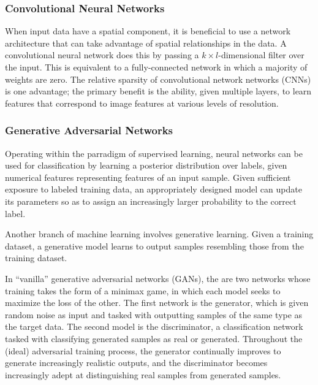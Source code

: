 \subsubsection{Convolutional Neural Networks}
When input data have a spatial component, it is beneficial to use a network architecture 
that can take advantage of spatial relationships in the data. A convolutional neural network 
does this by passing a $k \times l$-dimensional filter over the input. 
This is equivalent to a fully-connected network in which a majority of weights are zero.
The relative sparsity of convolutional network networks (CNNs) is one advantage; the primary 
benefit is the ability, given multiple layers, to learn features that correspond to image 
features at various levels of resolution.

\subsubsection{Generative Adversarial Networks}
Operating within the parradigm of supervised learning, neural networks
can be used for classification by learning a posterior distribution over 
labels, given numerical features representing features of an input sample.
Given sufficient exposure to labeled training data, an appropriately designed 
model can update its parameters so as to assign an increasingly larger probability
to the correct label.

Another branch of machine learning involves generative learning. Given a training dataset,
a generative model learns to output samples resembling those from the training dataset. 

In ``vanilla'' generative adversarial networks (GANs), the are two networks whose training 
takes the form of a minimax game, in which each model seeks to maximize the loss of the other.
The first network is the generator, which is given random noise as input and tasked with 
outputting samples of the same type as the target data. The second model is the discriminator,
a classification network tasked with classifying generated samples as real or generated. 
Throughout the (ideal) adversarial training process, the generator continually improves to 
generate increasingly realistic outputs, and the discriminator becomes increasingly adept at 
distinguishing real samples from generated samples.